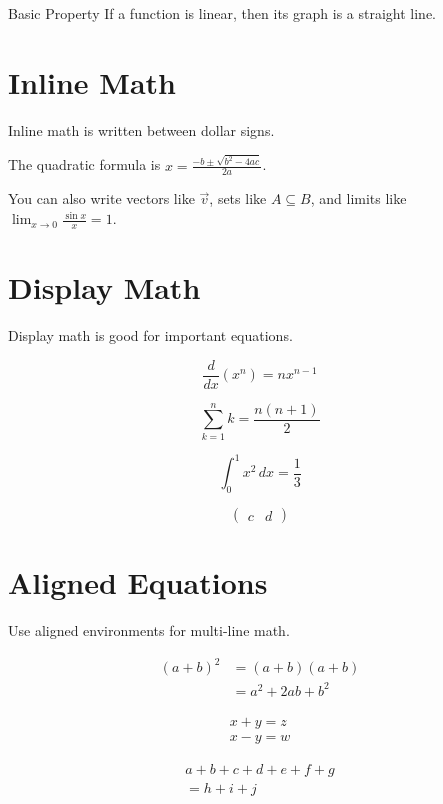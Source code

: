 \documentclass{article}
\begin{document}
\begin{boxtheorem}{Basic Property}
If a function is linear, then its graph is a straight line.
\end{boxtheorem}

\section{Inline Math}
Inline math is written between dollar signs.

The quadratic formula is $x = \frac{-b \pm \sqrt{b^2-4ac}}{2a}$.

You can also write vectors like $\vec{v}$, sets like $A \subseteq B$, and limits like $\lim_{x\to 0} \frac{\sin x}{x} = 1$.

\section{Display Math}
Display math is good for important equations.

\begin{equation}
\frac{d}{dx}(x^n)=n x^{n-1}
\end{equation}

\begin{equation*}
\sum_{k=1}^{n} k = \frac{n(n+1)}{2}
\end{equation*}

\[
\int_0^1 x^2\,dx = \frac{1}{3}
\]

\[
\left(\begin{array}{cc}
c & d
\end{array}\right)
\]

\section{Aligned Equations}
Use aligned environments for multi-line math.

\begin{align*}
(a+b)^2 &= (a+b)(a+b) \\
        &= a^2 + 2ab + b^2
\end{align*}

\begin{gather*}
x+y=z \\
x-y=w
\end{gather*}

\begin{multline*}
a+b+c+d+e+f+g \\
= h+i+j
\end{multline*}
\end{document}
